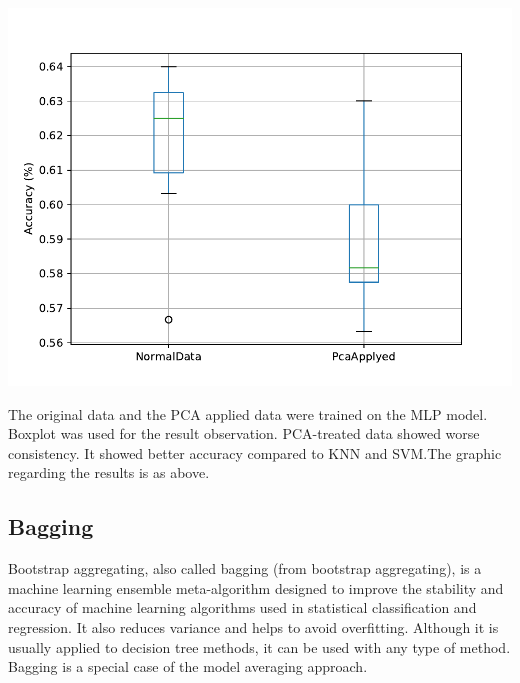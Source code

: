 \documentclass{article}
\begin{document}
\begin{center}
    \vspace{1em}
        \includegraphics[scale=0.75]{graphs/MLP.pdf}
    \vspace{1em}
\end{center}

The original data and the PCA applied data were trained on the MLP model. Boxplot was used for the result observation. PCA-treated data showed worse consistency. It showed better accuracy compared to KNN and SVM.The graphic regarding the results is as above.



\subsection{ Bagging }

Bootstrap aggregating, also called bagging (from bootstrap aggregating), is a machine learning ensemble meta-algorithm designed to improve the stability and accuracy of machine learning algorithms used in statistical classification and regression. It also reduces variance and helps to avoid overfitting. Although it is usually applied to decision tree methods, it can be used with any type of method. Bagging is a special case of the model averaging approach.
\end{document}
